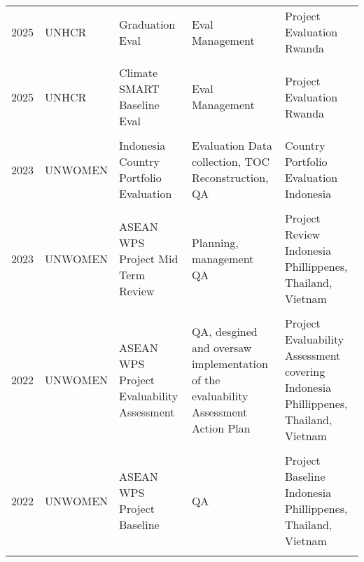 \documentclass[
  10pt,
]{article}
\begin{document}
\begin{landscape}
\begin{tabularx}{\linewidth}{|l|l|X|X|X|}
2025 & UNHCR & Graduation Eval & Eval Management & Project Evaluation Rwanda \\ &&&&  \\ 2025 & UNHCR & Climate SMART Baseline Eval & Eval Management & Project Evaluation Rwanda \\ &&&&  \\2023 & UNWOMEN & Indonesia Country Portfolio Evaluation & Evaluation Data collection, TOC Reconstruction, QA & Country Portfolio Evaluation Indonesia \\ &&&&  \\ 2023 & UNWOMEN & ASEAN WPS Project Mid Term Review & Planning, management QA & Project Review Indonesia Phillippenes, Thailand, Vietnam \\ &&&&  \\2022 & UNWOMEN & ASEAN WPS Project Evaluability Assessment & QA, desgined and oversaw implementation of the evaluability Assessment Action Plan & Project Evaluability Assessment covering Indonesia Phillippenes, Thailand, Vietnam \\ &&&&  \\
2022 & UNWOMEN & ASEAN WPS Project Baseline & QA & Project Baseline Indonesia Phillippenes, Thailand, Vietnam \\ &&&&  \\
\hline
\end{tabularx}
\end{landscape}
\end{document}
